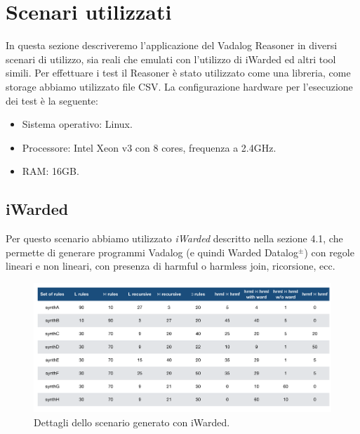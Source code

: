 \section{Scenari utilizzati}

In questa sezione descriveremo l'applicazione del Vadalog Reasoner in diversi scenari di utilizzo, sia reali che emulati con l'utilizzo di iWarded ed altri tool simili.\newline
Per effettuare i test il Reasoner è stato utilizzato come una libreria, come storage abbiamo utilizzato file CSV. \newline
La configurazione hardware per l'esecuzione dei test è la seguente:
\begin{itemize}
	\item Sistema operativo: Linux.
	\item Processore: Intel Xeon v3 con 8 cores, frequenza a 2.4GHz.
	\item RAM: 16GB.
\end{itemize}

\subsection{iWarded}

Per questo scenario abbiamo utilizzato \emph{iWarded} descritto nella sezione 4.1, che permette di generare programmi Vadalog (e quindi Warded Datalog$^\pm$) con regole lineari e non lineari, con presenza di harmful o harmless join, ricorsione, ecc. \newline
\begin{figure}[h]
	\centering
	\includegraphics[width=0.8\linewidth]{figure/iWardedScenario}
	\caption{Dettagli dello scenario generato con iWarded.}
	\label{fig:iwarded}
\end{figure}

